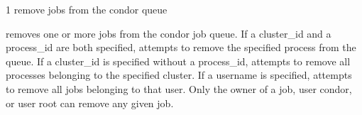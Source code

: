 \begin{ManPage}{\label{man-condor-rm}}{1}
{remove jobs from the condor queue}
\Synopsis {}

\Description

 removes one or more jobs from the condor job queue.  If a
cluster\_id and a process\_id are both specified,  attempts to
remove the specified process from the queue. If a cluster\_id is specified
without a process\_id,  attempts to remove all processes belonging
to the specified cluster. If a username is specified,  attempts to
remove all jobs belonging to that user. Only the owner of a job, user condor,
or user root can remove any given job.

\begin{Options}
\end{Options}

\end{ManPage}
